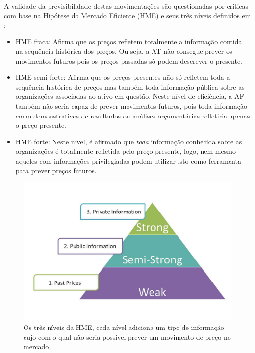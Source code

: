 \documentclass[grad,numbers]{coppe}
\begin{document}
  		\paragraph{}A validade da previsibilidade destas movimentações são questionadas por críticas com base na Hipótese do Mercado Eficiente (HME) e seus três níveis definidos em \cite{emh}:
			\begin{itemize}
				\item HME fraca: Afirma que os preços refletem totalmente a informação contida na sequência histórica dos preços. Ou seja, a AT não consegue prever os movimentos futuros pois os preços passadas só podem descrever o presente.
				\item HME semi-forte: Afirma que os preços presentes não só refletem toda a sequência histórica de preços mas também toda informação pública sobre as organizações associadas ao ativo em questão. Neste nível de eficiência, a AF também não seria capaz de prever movimentos futuros, pois toda informação como demonstrativos de resultados ou análises orçamentárias refletiria apenas o preço presente.
				\item HME forte: Neste nível, é afirmado que \textit{toda} informação conhecida sobre as organizações é totalmente refletida pelo preço presente, logo, nem mesmo aqueles com informações privilegiadas podem utilizar isto como ferramenta para prever preços futuros.
			\end{itemize}
 			\begin{figure}[h]
 				\includegraphics[width=13cm]{emh.jpg}
 				\caption{Os três níveis da HME, cada nível adiciona um tipo de informação cujo com o qual não seria possível prever um movimento de preço no mercado\cite{emh-article}.}
 				\label{fig:emh}
 			\end{figure}
\end{document}
